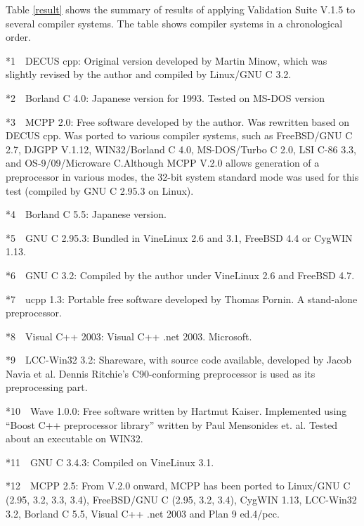 \documentclass[twocolumn]{article}
\begin{document}
Table \ref{result} shows the summary of results of applying Validation Suite V.1.5 to several compiler systems.  The table shows compiler systems in a chronological order.

\vspace{8pt}
*1~~DECUS cpp: Original version developed by Martin Minow, which was slightly revised by the author and compiled by Linux/GNU C 3.2.~\cite{decus}

*2~~Borland C 4.0: Japanese version for 1993.  Tested on MS-DOS version~\cite{bc4}

*3~~MCPP 2.0: Free software developed by the author.  Was rewritten based on DECUS cpp.  Was ported to various compiler systems, such as FreeBSD/GNU C 2.7, DJGPP V.1.12, WIN32/Borland C 4.0, MS-DOS/Turbo C 2.0, LSI C-86 3.3, and OS-9/09/Microware C.\@  Although MCPP V.2.0 allows generation of a preprocessor in various modes, the 32-bit system standard mode was used for this test (compiled by GNU C 2.95.3 on Linux).

*4~~Borland C 5.5: Japanese version.~\cite{bc55}

*5~~GNU C 2.95.3: Bundled in VineLinux 2.6 and 3.1, FreeBSD 4.4 or CygWIN 1.13.

*6~~GNU C 3.2: Compiled by the author under VineLinux 2.6 and FreeBSD 4.7.~\cite{gcc}

*7~~ucpp 1.3: Portable free software developed by Thomas Pornin.  A stand-alone preprocessor.~\cite{ucpp}

*8~~Visual C++ 2003: Visual C++ .net 2003.  Microsoft.~\cite{vc}

*9~~LCC-Win32 3.2: Shareware, with source code available, developed by Jacob Navia et al.  Dennis Ritchie's C90-conforming preprocessor is used as its preprocessing part.~\cite{lcc-win32}

*10~~Wave 1.0.0: Free software written by Hartmut Kaiser.  Implemented using ``Boost C++ preprocessor library'' written by Paul Mensonides et. al.  Tested about an executable on WIN32.~\cite{wave}

*11~~GNU C 3.4.3: Compiled on VineLinux 3.1.

*12~~MCPP 2.5: From V.2.0 onward, MCPP has been ported to Linux/GNU C (2.95, 3.2, 3.3, 3.4), FreeBSD/GNU C (2.95, 3.2, 3.4), CygWIN 1.13, LCC-Win32 3.2, Borland C 5.5, Visual C++ .net 2003 and Plan 9 ed.4/pcc.~\cite{mcpp}

\vspace{8pt}
\end{document}
